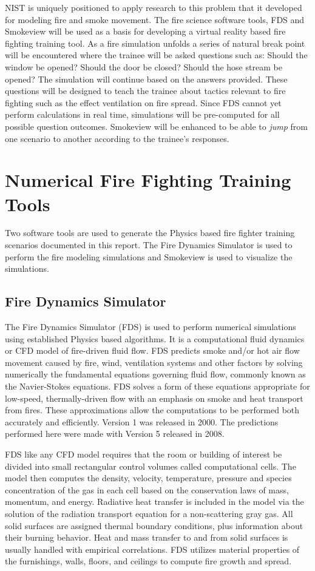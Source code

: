\documentclass[11pt]{book}
\begin{document}
NIST is uniquely positioned to apply research to this problem that it developed for modeling fire and smoke movement.  The fire science software tools, FDS and Smokeview will be used as a basis for developing a virtual reality based fire fighting training tool.  As a fire simulation unfolds a series of natural break point will be encountered where the trainee will be asked questions such as: Should the window be opened?  Should the door be closed? Should the hose stream be opened?  The simulation will continue based on the answers provided.  These questions will be designed to teach the trainee about tactics relevant to fire fighting such as the effect ventilation on fire spread.    Since FDS cannot yet perform calculations in real time, simulations will be pre-computed for all possible question outcomes.  Smokeview will be enhanced to be able to {\em jump}
from one scenario to another according to the trainee's responses.

\section{Numerical Fire Fighting Training Tools}
Two software tools are used to generate the Physics based fire fighter training scenarios documented in this report.  The Fire Dynamics Simulator is used to perform the fire modeling simulations and Smokeview is used to visualize the simulations.

\subsection{Fire Dynamics Simulator}
The Fire Dynamics Simulator (FDS) is used to perform numerical simulations using established Physics based algorithms. It is a computational fluid dynamics or CFD model of fire-driven fluid flow. FDS predicts smoke and/or hot air flow movement caused by fire, wind, ventilation systems and other factors by solving numerically the fundamental equations governing fluid flow, commonly known as the Navier-Stokes equations. FDS solves a form of these equations appropriate for low-speed, thermally-driven flow with an emphasis on smoke and heat transport from fires. These approximations allow the computations to be performed both accurately and efficiently. Version 1 was released in 2000. The predictions performed here were made with Version 5 released in 2008.

FDS like any CFD model requires that the room or building of interest be divided into small rectangular control volumes called computational cells. The model then computes the density, velocity, temperature, pressure and species concentration of the gas in each cell based on the conservation laws of mass, momentum, and energy.  Radiative heat transfer is included in the model via the solution of the radiation transport equation for a non-scattering gray gas. All solid surfaces are assigned thermal boundary conditions, plus information about their burning behavior. Heat and mass transfer to and from solid surfaces is usually handled with empirical correlations. FDS utilizes material properties of the furnishings, walls, floors, and ceilings to compute fire growth and spread.
\end{document}
